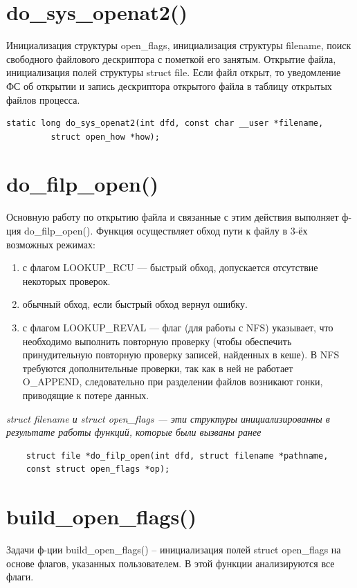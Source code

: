 \section{do\_sys\_openat2()}

Инициализация структуры open\_flags, инициализация структуры filename, поиск свободного файлового дескриптора с пометкой его занятым. Открытие файла, инициализация полей структуры struct file. Если файл открыт, то уведомление ФС об открытии и запись дескриптора открытого файла в таблицу открытых файлов процесса.

\begin{lstlisting}
static long do_sys_openat2(int dfd, const char __user *filename,
         struct open_how *how);
\end{lstlisting}


\section{do\_filp\_open()}
Основную работу по открытию файла и связанные с этим действия выполняет ф-ция do\_filp\_open(). Функция осуществляет обход пути к файлу в 3-ёх возможных режимах:
\begin{enumerate}
	\item с флагом LOOKUP\_RCU --- быстрый обход, допускается отсутствие некоторых проверок.
	\item обычный обход, если быстрый обход вернул ошибку.
	\item с флагом LOOKUP\_REVAL --- флаг (для работы с NFS) указывает, что необходимо выполнить повторную проверку (чтобы обеспечить принудительную повторную проверку записей, найденных в кеше). В NFS требуются дополнительные проверки, так как в ней не работает \\ O\_APPEND, следовательно при разделении файлов возникают гонки, приводящие к потере данных.
\end{enumerate}

\textit{struct filename и struct open\_flags --- эти структуры инициализированны в результате работы функций, которые были вызваны ранее}

\begin{lstlisting}
    struct file *do_filp_open(int dfd, struct filename *pathname,
    const struct open_flags *op);
\end{lstlisting}

\section{build\_open\_flags()}
Задачи ф-ции build\_open\_flags() -- инициализация полей struct open\_flags на основе флагов, указанных пользователем. В этой функции анализируются все флаги.

